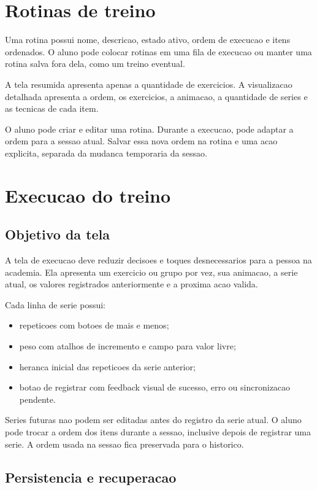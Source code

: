 \documentclass[12pt,a4paper]{article}
\begin{document}
\section{Rotinas de treino}

Uma rotina possui nome, descricao, estado ativo, ordem de execucao e itens ordenados. O aluno pode colocar rotinas em uma fila de execucao ou manter uma rotina salva fora dela, como um treino eventual.

A tela resumida apresenta apenas a quantidade de exercicios. A visualizacao detalhada apresenta a ordem, os exercicios, a animacao, a quantidade de series e as tecnicas de cada item.

O aluno pode criar e editar uma rotina. Durante a execucao, pode adaptar a ordem para a sessao atual. Salvar essa nova ordem na rotina e uma acao explicita, separada da mudanca temporaria da sessao.

\section{Execucao do treino}

\subsection{Objetivo da tela}

A tela de execucao deve reduzir decisoes e toques desnecessarios para a pessoa na academia. Ela apresenta um exercicio ou grupo por vez, sua animacao, a serie atual, os valores registrados anteriormente e a proxima acao valida.

Cada linha de serie possui:

\begin{itemize}[leftmargin=*]
    \item repeticoes com botoes de mais e menos;
    \item peso com atalhos de incremento e campo para valor livre;
    \item heranca inicial das repeticoes da serie anterior;
    \item botao de registrar com feedback visual de sucesso, erro ou sincronizacao pendente.
\end{itemize}

Series futuras nao podem ser editadas antes do registro da serie atual. O aluno pode trocar a ordem dos itens durante a sessao, inclusive depois de registrar uma serie. A ordem usada na sessao fica preservada para o historico.

\subsection{Persistencia e recuperacao}
\end{document}
